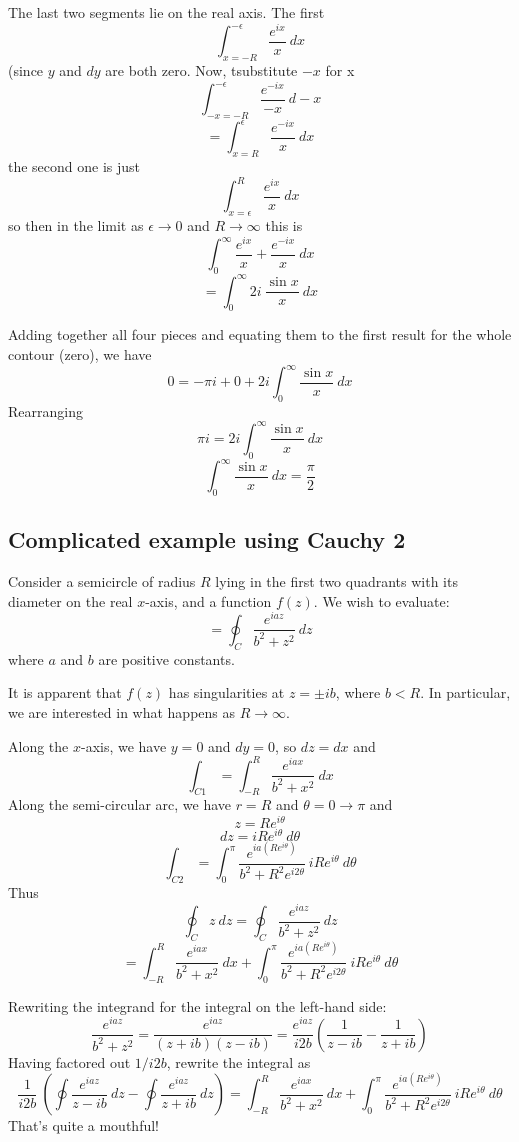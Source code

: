 \documentclass[11pt, oneside]{article}
\begin{document}
The last two segments lie on the real axis.  The first
\[ \int_{x=-R}^{-\epsilon} \frac{e^{ix}}{x} \ dx \]
(since $y$ and $dy$ are both zero.  Now, tsubstitute $-x$ for x
\[ \int _{-x=-R}^{-\epsilon} \frac{e^{-ix}}{-x} \ d -x \]
\[ = \int _{x=R}^{\epsilon} \frac{e^{-ix}}{x} \ dx \]
the second one is just
\[ \int _{x=\epsilon}^{R} \frac{e^{ix}}{x} \ dx \]
so then in the limit as $\epsilon \rightarrow 0$ and $R \rightarrow \infty$ this is
\[ \int_0^{\infty} \frac{e^{ix}}{x} + \frac{e^{-ix}}{x} \ dx \]
\[ =  \int_0^{\infty} 2i \ \frac{\sin x}{x} \ dx \]

Adding together all four pieces and equating them to the first result for the whole contour (zero), we have
\[ 0 =  -\pi i + 0 + 2i \int_0^{\infty} \frac{\sin x}{x} \ dx  \]
Rearranging 
\[ \pi i = 2i \int_0^{\infty} \frac{\sin x}{x} \ dx  \]
\[  \int_0^{\infty} \frac{\sin x}{x} \ dx = \frac{\pi}{2}  \]

\subsection*{Complicated example using Cauchy 2}
Consider a semicircle of radius $R$ lying in the first two quadrants with its diameter on the real $x$-axis, and a function $f(z)$.   We wish to evaluate:
\[ = \oint_C \frac{e^{iaz}}{b^2 + z^2} \ dz \]
where $a$ and $b$ are positive constants.

It is apparent that $f(z)$ has singularities at $z = \pm ib$, where $b < R$.  In particular, we are interested in what happens as $R \rightarrow \infty$.

Along the $x$-axis, we have $y=0$ and $dy = 0$, so $dz = dx$ and
\[ \int_{C1} = \int_{-R}^R \frac{e^{iax}}{b^2 + x^2} \ dx \]
Along the semi-circular arc, we have $r = R$ and $\theta = 0 \rightarrow \pi$ and
\[ z = Re^{i\theta} \]
\[ dz = iRe^{i\theta} \ d \theta \]
\[ \int_{C2} = \int_0^{\pi}  \frac{e^{ia(Re^{i\theta})}}{b^2 + R^2e^{i2\theta}}  \ iRe^{i\theta} \ d \theta \]
Thus
\[ \oint_C z \ dz = \oint_C \frac{e^{iaz}}{b^2 + z^2} \ dz \]
\[ = \int_{-R}^R \frac{e^{iax}}{b^2 + x^2} \ dx + \int_0^{\pi}  \frac{e^{ia(Re^{i\theta})}}{b^2 + R^2e^{i2\theta}}  \ iRe^{i\theta} \ d \theta \]

Rewriting the integrand for the integral on the left-hand side:
\[ \frac{e^{iaz}}{b^2 + z^2} = \frac{e^{iaz}}{(z + ib)(z - ib)} = \frac{e^{iaz}}{i2b} ( \frac{1}{z-ib} - \frac{1}{z+ib}) \]
Having factored out $1/i2b$, rewrite the integral as
\[ \frac{1}{i2b} \ (\oint \frac{e^{iaz}}{z-ib} \ dz - \oint \frac{e^{iaz}}{z + ib} \ dz) = \int_{-R}^R \frac{e^{iax}}{b^2 + x^2} \ dx + \int_0^{\pi}  \frac{e^{ia(Re^{i\theta})}}{b^2 + R^2e^{i2\theta}}  \ iRe^{i\theta} \ d \theta \]
That's quite a mouthful!
\end{document}

